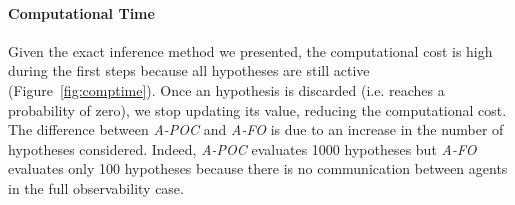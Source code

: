 
\vspace{-0.3cm}
\paragraph{Computational Time}

Given the exact inference method we presented, the computational cost is high during the first steps because all hypotheses are still active (Figure~\ref{fig:comptime}). Once an hypothesis is discarded (i.e. reaches a probability of zero), we stop updating its value, reducing the computational cost. The difference between \emph{A-POC} and \emph{A-FO} is due to an increase in the number of hypotheses considered. Indeed, \emph{A-POC} evaluates 1000 hypotheses but \emph{A-FO} evaluates only 100 hypotheses because there is no communication between agents in the full observability case.


